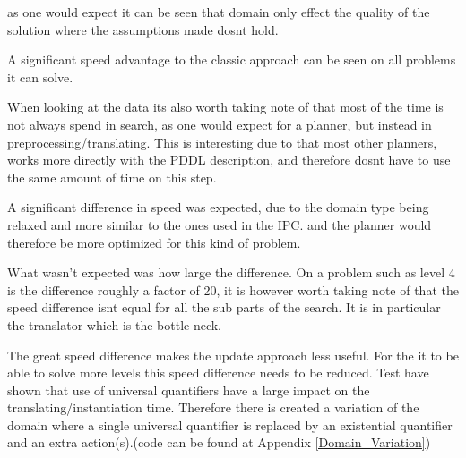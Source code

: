 			
			as one would expect it can be seen that domain only effect the quality of the solution where the assumptions made dosnt hold.
			
			
		
		
			A significant speed advantage to the classic approach can be seen on all problems it can solve.
						
			When looking at the data its also worth taking note of that most of the time is not always spend in search, as one would expect for a planner, but instead in preprocessing/translating. This is interesting due to that most other planners, works more directly with the PDDL description, and therefore dosnt have to use the same amount of time on this step.
			
			A significant difference in speed was expected, due to the domain type being relaxed and more similar to the ones used in the IPC. and the planner would therefore be more optimized for this kind of problem.
			

			What wasn't expected was how large the difference. On a problem such as level 4 is the difference roughly a factor of 20, it is however worth taking note of that the speed difference isnt equal for all the sub parts of the search. It is in particular the translator which is the bottle neck. 
			
			The great speed difference makes the update approach less useful. For the it to be able to solve more levels this speed difference needs to be reduced. Test have shown that use of universal quantifiers have a large impact on the translating/instantiation time. Therefore there is created a variation of the domain where a single universal quantifier is replaced by an existential quantifier and an extra action(s).(code can be found at Appendix \ref{Domain_Variation})


